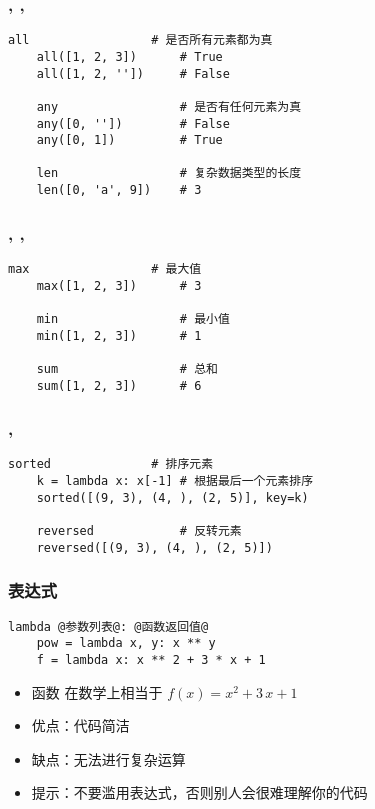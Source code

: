 \begin{frame} [fragile]
	\frametitle{, , }
	\linespread{1.5}
	\begin{lstlisting}[style=pythonstyle, gobble=4, texcl]
	all					# 是否所有元素都为真
	all([1, 2, 3])		# True
	all([1, 2, ''])		# False

	any					# 是否有任何元素为真
	any([0, ''])		# False
	any([0, 1])			# True

	len					# 复杂数据类型的长度
	len([0, 'a', 9])	# 3
	\end{lstlisting}
\end{frame}

\begin{frame} [fragile]
	\frametitle{, , }
	\linespread{1.5}
	\begin{lstlisting}[style=pythonstyle, gobble=4, texcl]
	max					# 最大值
	max([1, 2, 3])		# 3

	min					# 最小值
	min([1, 2, 3])		# 1

	sum					# 总和
	sum([1, 2, 3])		# 6
	\end{lstlisting}
\end{frame}

\begin{frame} [fragile]
	\frametitle{, }
	\linespread{1.5}
	\begin{lstlisting}[style=pythonstyle, gobble=4, texcl]
	sorted				# 排序元素
	k = lambda x: x[-1]	# 根据最后一个元素排序
	sorted([(9, 3), (4, ), (2, 5)], key=k)

	reversed			# 反转元素
	reversed([(9, 3), (4, ), (2, 5)])
	\end{lstlisting}
\end{frame}

\begin{frame} [fragile]
	\frametitle{表达式}
	\linespread{1.5}
	\begin{lstlisting}[style=pythonstyle, gobble=4, texcl, escapechar=@]
	lambda @参数列表@: @函数返回值@
	pow = lambda x, y: x ** y
	f = lambda x: x ** 2 + 3 * x + 1
	\end{lstlisting}
	\begin{itemize}
	\item 函数  在数学上相当于 $f(x) = x^2 + 3\,x + 1$
	\item 优点：代码简洁
	\item 缺点：无法进行复杂运算
	\item 提示：不要滥用表达式，否则别人会很难理解你的代码
	\end{itemize}
\end{frame}

